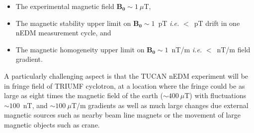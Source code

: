 \begin{itemize}

    \item The experimental magnetic field $\bm{B_0}\sim1~\mu$T, 
    \item The magnetic stability upper limit on $\bm{B_0}\sim1$~pT {\it i.e.} $<$~pT drift in one nEDM measurement cycle, and 
    \item The magnetic homogeneity upper limit on $\bm{B_0}\sim1$~nT/m {\it i.e.} $<$~nT/m field gradient. 
    
\end{itemize}

A particularly challenging aspect is that the TUCAN nEDM experiment will be in fringe field of TRIUMF cyclotron, at a location where the fringe could be as large as eight times the magnetic field of the earth ($\sim400~\mu$T) with fluctuations $\sim100$~nT, and $\sim100~\mu$T/m gradients as well as much large changes due external magnetic sources such as nearby beam line magnets or the movement of large magnetic objects such as crane.






